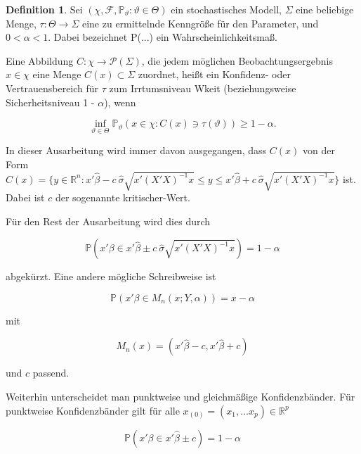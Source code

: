 \documentclass[12pt,a4paper]{article}
\theoremstyle{definition}
\newtheorem{Definition}{Definition}[subsection]
\theoremstyle{definition}
\theoremstyle{definition}
\theoremstyle{definition}
\begin{document}
\begin{Definition}
Sei $( \chi, \mathscr{F} , \mathbb{P}_\vartheta : \vartheta \in \Theta) $ ein stochastisches Modell, $\Sigma$ eine beliebige Menge, $\tau : \Theta \rightarrow \Sigma $ eine zu ermittelnde Kenngröße für den Parameter, und $0 < \alpha < 1$. Dabei bezeichnet \gls{P(...)} ein Wahrscheinlichkeitsmaß.

Eine Abbildung $C : \chi \rightarrow \mathscr{P}(\Sigma)$, die jedem möglichen Beobachtungsergebnis $x \in \chi$ eine Menge $C(x) \subset \Sigma$ zuordnet, heißt ein Konfidenz- oder Vertrauensbereich für $\tau$ zum Irrtumsniveau \gls{Wkeit} (beziehungsweise Sicherheitsniveau 1 - $\alpha$), wenn

\begin{equation*}
\inf_{\vartheta \in \Theta} \mathbb{P}_{\vartheta}(x \in \chi : C(x) \ni \tau(\vartheta)) \geq 1 - \alpha.
\end{equation*}

\end{Definition}

In dieser Ausarbeitung wird immer davon ausgegangen, dass $C(x)$ von der Form $C(x) = \{ y \in \mathbb{R}^n :  x'\hat{\beta} - c ~ \hat{\sigma}\sqrt{x'(X'X)^{-1}x} \leq y \leq x'\hat{\beta} + c ~ \hat{\sigma}\sqrt{x'(X'X)^{-1}x} \}$ ist. Dabei ist $c$ der sogenannte  \gls{kritischer-Wert}.
 
Für den Rest der Ausarbeitung wird dies durch

\begin{equation*}
\mathbb{P}(x' \beta \in x'\hat{\beta} \pm c ~ \hat{\sigma}\sqrt{x'(X'X)^{-1}x}) = 1 - \alpha
\end{equation*} 

abgekürzt. Eine andere mögliche Schreibweise ist 

\begin{equation*}
\mathbb{P}(x'\beta \in M_n(x;Y,\alpha)) = x - \alpha
\end{equation*}

mit 

\begin{equation*}
M_n(x) = (x'\hat{\beta} -c, x'\hat{\beta} +c) 
\end{equation*}

und $c$ passend.

Weiterhin unterscheidet man punktweise und gleichmäßige Konfidenzbänder. Für punktweise Konfidenzbänder gilt für alle $x_{(0)} = (x_{1}, \ldots x_{p}) \in \mathbb{R}^p$

\begin{equation*}
\mathbb{P}(x'\beta \in x' \hat{\beta} \pm c) = 1-\alpha
\end{equation*}
\end{document}
